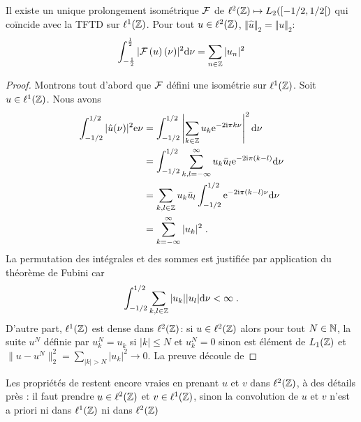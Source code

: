 \begin{theorem}
Il existe un unique prolongement isom\'etrique  $\mathcal{F}$ de $\ell^2(\mathbb{Z}) \mapsto L_2(\left[-1/2,1/2\right[)$ qui coïncide avec la TFTD sur $\ell^1(\mathbb{Z})$. Pour tout $u \in \ell^2(\mathbb{Z})$,  $\Vert\hat{u}\Vert_{2}=\Vert u\Vert_{2}$:
$$
\int_{-\frac{1}{2}}^{\frac{1}{2}}|\mathcal{F}\left( u \right)(\nu)|^{2} \mathrm{d}\nu=\sum_{n\in \mathbb{Z}}|u_{n}|^{2}
$$
\end{theorem}
\begin{proof}
Montrons tout d'abord que $\mathcal{F}$ d\'efini une isom\'etrie sur $\ell^1(\mathbb{Z})$. Soit $u \in \ell^1(\mathbb{Z})$. Nous avons
\begin{align*}
\int_{-1/2}^{1/2} |\hat{u}(\nu)|^2 \mathrm{e} \nu &= \int_{-1/2}^{1/2} \left| \sum_{k \in \mathbb{Z}} u_k \mathrm{e}^{-2 \mathrm{i} \pi k \nu} \right|^2 \mathrm{d} \nu \\
&= \int_{-1/2}^{1/2} \sum_{k,l=-\infty}^{\infty} u_k \bar{u}_l \mathrm{e}^{-2 \mathrm{i} \pi (k-l)} \mathrm{d} \nu \\
&= \sum_{k,l \in \mathbb{Z}} u_k \bar{u}_l \int_{-1/2}^{1/2} \mathrm{e}^{- 2 \mathrm{i} \pi (k-l) \nu} \mathrm{d} \nu \\
&= \sum_{k=-\infty}^{\infty} |u_k|^2 \;.
\end{align*}
La permutation des int\'egrales et des sommes est justifi\'ee par application du th\'eor\`eme de Fubini car
\[
\int_{-1/2}^{1/2} \sum_{k,l \in \mathbb{Z}} |u_k| |u_l| \mathrm{d} \nu < \infty \;.
\]
D'autre part, $\ell^1(\mathbb{Z})$ est dense dans $\ell^2(\mathbb{Z})$: si $u \in \ell^2(\mathbb{Z})$ alors pour tout $N \in \mathbb{N}$, la suite $u^N$ d\'efinie par
$u^N_k = u_k$ si $|k| \leq N$ et $u^N_k= 0$ sinon est \'el\'ement de $L_1(\mathbb{Z})$ et $\| u - u^N \|_2^2 = \sum_{|k| > N} |u_k|^2 \to 0$. La preuve d\'ecoule de 
\end{proof}
Les propri\'{e}t\'{e}s de  restent encore vraies en prenant $u$ et $v$ dans $\ell^2(\mathbb{Z})$, \`{a} des d\'{e}tails pr\`{e}s : il faut prendre $u\in \ell^2(\mathbb{Z})$ et $v\in \ell^1(\mathbb{Z})$, sinon la convolution de $u$ et $v$ n'est a priori ni dans $\ell^1(\mathbb{Z})$ ni dans $\ell^2(\mathbb{Z})$

